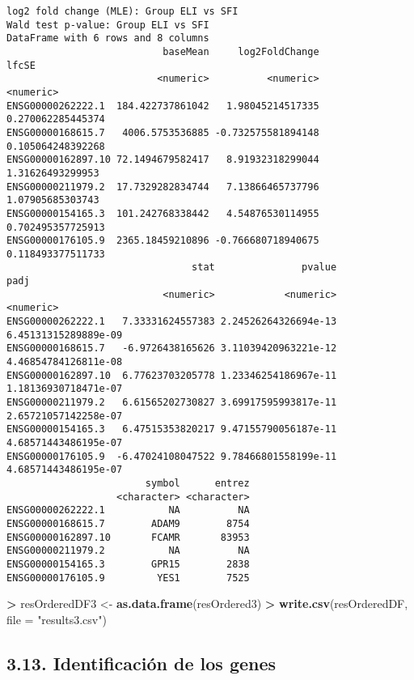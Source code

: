 \documentclass[
]{article}
\newenvironment{Shaded}{\begin{snugshade}}{\end{snugshade}}
\newcommand{\DataTypeTok}[1]{\textcolor[rgb]{0.13,0.29,0.53}{#1}}
\newcommand{\KeywordTok}[1]{\textcolor[rgb]{0.13,0.29,0.53}{\textbf{#1}}}
\newcommand{\NormalTok}[1]{#1}
\newcommand{\OperatorTok}[1]{\textcolor[rgb]{0.81,0.36,0.00}{\textbf{#1}}}
\newcommand{\StringTok}[1]{\textcolor[rgb]{0.31,0.60,0.02}{#1}}
\begin{document}
\begin{verbatim}
log2 fold change (MLE): Group ELI vs SFI 
Wald test p-value: Group ELI vs SFI 
DataFrame with 6 rows and 8 columns
                           baseMean     log2FoldChange             lfcSE
                          <numeric>          <numeric>         <numeric>
ENSG00000262222.1  184.422737861042   1.98045214517335 0.270062285445374
ENSG00000168615.7   4006.5753536885 -0.732575581894148 0.105064248392268
ENSG00000162897.10 72.1494679582417   8.91932318299044  1.31626493299953
ENSG00000211979.2  17.7329282834744   7.13866465737796  1.07905685303743
ENSG00000154165.3  101.242768338442   4.54876530114955 0.702495357725913
ENSG00000176105.9  2365.18459210896 -0.766680718940675 0.118493377511733
                                stat               pvalue                 padj
                           <numeric>            <numeric>            <numeric>
ENSG00000262222.1   7.33331624557383 2.24526264326694e-13 6.45131315289889e-09
ENSG00000168615.7   -6.9726438165626 3.11039420963221e-12 4.46854784126811e-08
ENSG00000162897.10  6.77623703205778 1.23346254186967e-11 1.18136930718471e-07
ENSG00000211979.2   6.61565202730827 3.69917595993817e-11 2.65721057142258e-07
ENSG00000154165.3   6.47515353820217 9.47155790056187e-11 4.68571443486195e-07
ENSG00000176105.9  -6.47024108047522 9.78466801558199e-11 4.68571443486195e-07
                        symbol      entrez
                   <character> <character>
ENSG00000262222.1           NA          NA
ENSG00000168615.7        ADAM9        8754
ENSG00000162897.10       FCAMR       83953
ENSG00000211979.2           NA          NA
ENSG00000154165.3        GPR15        2838
ENSG00000176105.9         YES1        7525
\end{verbatim}

\begin{Shaded}
\begin{Highlighting}[]
\OperatorTok{>}\StringTok{ }\NormalTok{resOrderedDF3 <-}\StringTok{ }\KeywordTok{as.data.frame}\NormalTok{(resOrdered3)}
\OperatorTok{>}\StringTok{ }\KeywordTok{write.csv}\NormalTok{(resOrderedDF, }\DataTypeTok{file =} \StringTok{"results3.csv"}\NormalTok{)}
\end{Highlighting}
\end{Shaded}

\hypertarget{identificaciuxf3n-de-los-genes}{%
\subsection{3.13. Identificación de los
genes}\label{identificaciuxf3n-de-los-genes}}
\end{document}
